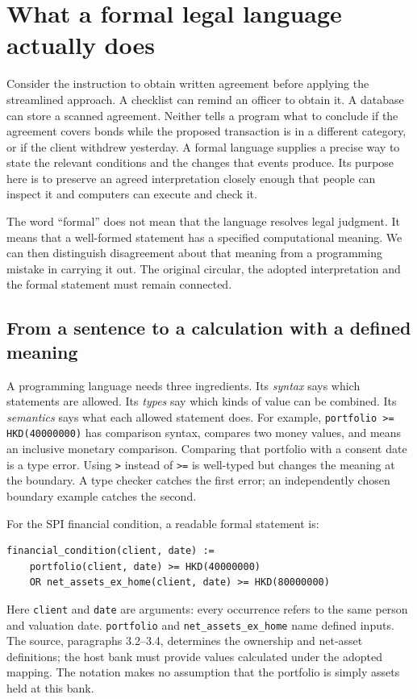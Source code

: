 \section{What a formal legal language actually does}
\label{sec:language-lesson}

Consider the instruction to obtain written agreement before applying the
streamlined approach. A checklist can remind an officer to obtain it. A database
can store a scanned agreement. Neither tells a program what to conclude if the
agreement covers bonds while the proposed transaction is in a different category,
or if the client withdrew yesterday. A formal language supplies a precise way
to state the relevant conditions and the changes that events produce. Its
purpose here is to preserve an agreed interpretation closely enough that people
can inspect it and computers can execute and check it.

The word ``formal'' does not mean that the language resolves legal judgment.
It means that a well-formed statement has a specified computational meaning.
We can then distinguish disagreement about that meaning from a programming
mistake in carrying it out. The original circular, the adopted interpretation
and the formal statement must remain connected.

\subsection{From a sentence to a calculation with a defined meaning}

A programming language needs three ingredients. Its \emph{syntax} says which
statements are allowed. Its \emph{types} say which kinds of value can be combined.
Its \emph{semantics} says what each allowed statement does. For example,
\texttt{portfolio >= HKD(40000000)} has comparison syntax, compares two money
values, and means an inclusive monetary comparison. Comparing that portfolio
with a consent date is a type error. Using \texttt{>} instead of \texttt{>=} is
well-typed but changes the meaning at the boundary. A type checker catches the
first error; an independently chosen boundary example catches the second.

For the SPI financial condition, a readable formal statement is:
\begin{lstlisting}[caption={Illustrative controlled syntax for Annex 1 paragraph 3.1. This is a teaching notation, not Catala or Stipula source.}]
financial_condition(client, date) :=
    portfolio(client, date) >= HKD(40000000)
    OR net_assets_ex_home(client, date) >= HKD(80000000)
\end{lstlisting}
Here \texttt{client} and \texttt{date} are arguments: every occurrence refers to
the same person and valuation date. \texttt{portfolio} and
\texttt{net\_assets\_ex\_home} name defined inputs. The source, paragraphs
3.2--3.4, determines the ownership and net-asset definitions; the host bank must
provide values calculated under the adopted mapping. The notation makes no
assumption that the portfolio is simply assets held at this bank.

